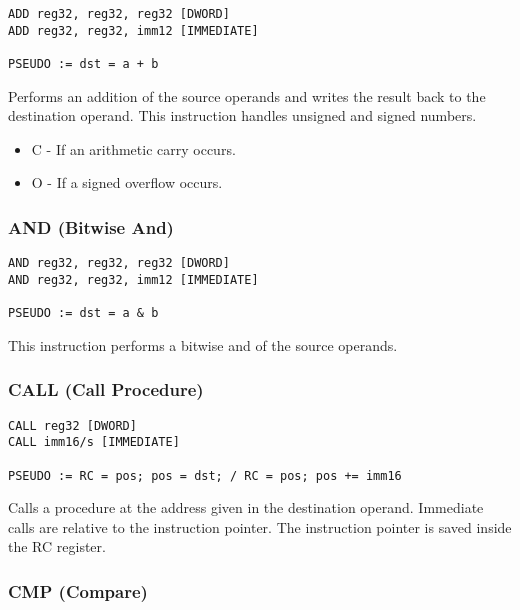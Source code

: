 \begin{verbatim}
ADD reg32, reg32, reg32 [DWORD]
ADD reg32, reg32, imm12 [IMMEDIATE]

PSEUDO := dst = a + b
\end{verbatim}


Performs an addition of the source operands and writes the result back to the destination operand. This instruction
handles unsigned and signed numbers.


\begin{itemize}
    \item C - If an arithmetic carry occurs.
    \item O - If a signed overflow occurs.
\end{itemize}

\subsubsection{AND (Bitwise And)}

\begin{verbatim}
AND reg32, reg32, reg32 [DWORD]
AND reg32, reg32, imm12 [IMMEDIATE]

PSEUDO := dst = a & b
\end{verbatim}


This instruction performs a bitwise and of the source operands.

\subsubsection{CALL (Call Procedure)}

\begin{verbatim}
CALL reg32 [DWORD]
CALL imm16/s [IMMEDIATE]

PSEUDO := RC = pos; pos = dst; / RC = pos; pos += imm16
\end{verbatim}


Calls a procedure at the address given in the destination operand. Immediate calls are relative to the instruction pointer. The instruction pointer
is saved inside the RC register. 

\subsubsection{CMP (Compare)}

